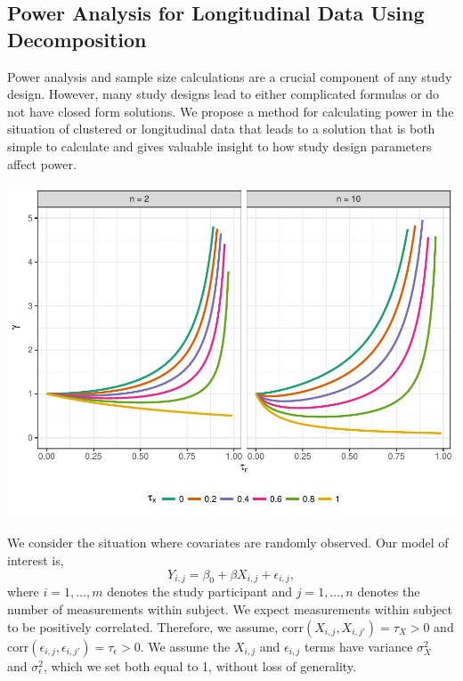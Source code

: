 \documentclass[12pt]{article}
\begin{document}
\begin{multicols}{2}
\subsection*{Power Analysis for Longitudinal Data Using Decomposition}
Power analysis and sample size calculations are a crucial component of any study design. However, many study designs lead to either complicated formulas or do not have closed form solutions. We propose a method for calculating power in the situation of clustered or longitudinal data that leads to a solution that is both simple to calculate and gives valuable insight to how study design parameters affect power.
\begin{center}\vspace{.5cm}
\includegraphics[width=1\linewidth]{gamma_analysis.pdf}
\label{fig:gamma}
\end{center}\vspace{.5cm}
\hspace{.5cm}We consider the situation where covariates are randomly observed. Our model of interest is,
\begin{equation} \label{eq:model}
Y_{i,j}=\beta_0+ \beta X_{i,j}+ \epsilon_{i,j},
\end{equation}
where $i=1,\ldots, m$ denotes the study participant and $j=1,\ldots,n$ denotes the number of measurements within subject. We expect measurements within subject to be positively correlated. Therefore, we assume, corr$(X_{i,j},X_{i,j'}) = \tau_X >0$ and corr$(\epsilon_{i,j},\epsilon_{i,j'}) = \tau_\epsilon>0$. We assume the $X_{i,j}$ and $\epsilon_{i,j}$ terms have variance $\sigma^2_X$ and $\sigma^2_\epsilon$, which we set both equal to 1, without loss of generality.

\end{multicols}
\end{document}
